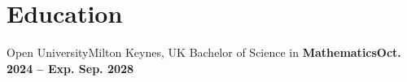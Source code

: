 

\section{Education}
  \resumeSubHeadingListStart
    \resumeSubheading
      {Open University}{Milton Keynes, UK}
      {Bachelor of Science in \textbf{Mathematics}}{\textbf{Oct. 2024 -- Exp. Sep. 2028}}
      
      \vspace{0.05cm}
      
      
    \spaceReducerMini
  \resumeSubHeadingListEnd

